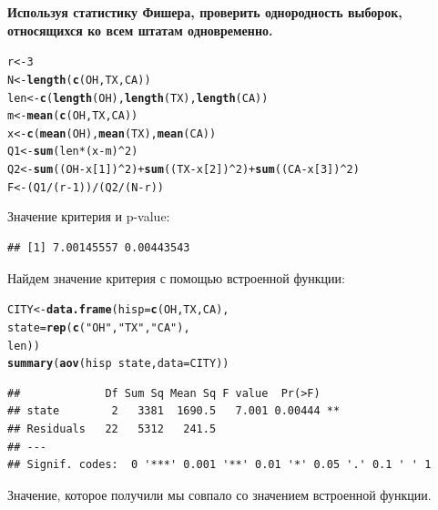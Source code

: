 \documentclass{article}\usepackage[]{graphicx}\usepackage[]{color}
\makeatletter
\newcommand{\hlnum}[1]{\textcolor[rgb]{0.686,0.059,0.569}{#1}}%
\newcommand{\hlstr}[1]{\textcolor[rgb]{0.192,0.494,0.8}{#1}}%
\newcommand{\hlopt}[1]{\textcolor[rgb]{0,0,0}{#1}}%
\newcommand{\hlstd}[1]{\textcolor[rgb]{0.345,0.345,0.345}{#1}}%
\newcommand{\hlkwb}[1]{\textcolor[rgb]{0.69,0.353,0.396}{#1}}%
\newcommand{\hlkwc}[1]{\textcolor[rgb]{0.333,0.667,0.333}{#1}}%
\newcommand{\hlkwd}[1]{\textcolor[rgb]{0.737,0.353,0.396}{\textbf{#1}}}%
\newenvironment{kframe}{%
 \def\at@end@of@kframe{}%
 \ifinner\ifhmode%
  \def\at@end@of@kframe{\end{minipage}}%
  \begin{minipage}{\columnwidth}%
 \fi\fi%
 \def\FrameCommand##1{\hskip\@totalleftmargin \hskip-\fboxsep
 \colorbox{shadecolor}{##1}\hskip-\fboxsep
     \hskip-\linewidth \hskip-\@totalleftmargin \hskip\columnwidth}%
 \MakeFramed {\advance\hsize-\width
   \@totalleftmargin\z@ \linewidth\hsize
   \@setminipage}}%
 {\par\unskip\endMakeFramed%
 \at@end@of@kframe}
\newenvironment{knitrout}{}{} %
\makeatother
\begin{document}
\textbf{Используя статистику Фишера, проверить однородность выборок, относящихся ко всем штатам одновременно.}

\begin{knitrout}
\color{fgcolor}\begin{kframe}
\begin{alltt}
\hlstd{r} \hlkwb{<-} \hlnum{3}
\hlstd{N} \hlkwb{<-} \hlkwd{length}\hlstd{(}\hlkwd{c}\hlstd{(OH, TX, CA))}
\hlstd{len} \hlkwb{<-} \hlkwd{c}\hlstd{(}\hlkwd{length}\hlstd{(OH),} \hlkwd{length}\hlstd{(TX),} \hlkwd{length}\hlstd{(CA))}
\hlstd{m} \hlkwb{<-} \hlkwd{mean}\hlstd{(}\hlkwd{c}\hlstd{(OH, TX, CA))}
\hlstd{x} \hlkwb{<-} \hlkwd{c}\hlstd{(}\hlkwd{mean}\hlstd{(OH),} \hlkwd{mean}\hlstd{(TX),} \hlkwd{mean}\hlstd{(CA))}
\hlstd{Q1} \hlkwb{<-} \hlkwd{sum}\hlstd{(len} \hlopt{*} \hlstd{(x} \hlopt{-} \hlstd{m)}\hlopt{^}\hlnum{2}\hlstd{)}
\hlstd{Q2} \hlkwb{<-} \hlkwd{sum}\hlstd{((OH} \hlopt{-} \hlstd{x[}\hlnum{1}\hlstd{])}\hlopt{^}\hlnum{2}\hlstd{)} \hlopt{+} \hlkwd{sum}\hlstd{((TX} \hlopt{-} \hlstd{x[}\hlnum{2}\hlstd{])}\hlopt{^}\hlnum{2}\hlstd{)} \hlopt{+} \hlkwd{sum}\hlstd{((CA} \hlopt{-} \hlstd{x[}\hlnum{3}\hlstd{])}\hlopt{^}\hlnum{2}\hlstd{)}
\hlstd{F} \hlkwb{<-} \hlstd{(Q1}\hlopt{/}\hlstd{(r} \hlopt{-} \hlnum{1}\hlstd{))} \hlopt{/} \hlstd{(Q2}\hlopt{/}\hlstd{(N} \hlopt{-} \hlstd{r))}
\end{alltt}
\end{kframe}
\end{knitrout}
Значение критерия и p-value:
\begin{knitrout}
\color{fgcolor}\begin{kframe}
\begin{verbatim}
## [1] 7.00145557 0.00443543
\end{verbatim}
\end{kframe}
\end{knitrout}
\newpage
Найдем значение критерия с помощью встроенной функции:
\begin{knitrout}
\color{fgcolor}\begin{kframe}
\begin{alltt}
\hlstd{CITY} \hlkwb{<-}\hlkwd{data.frame}\hlstd{(}\hlkwc{hisp} \hlstd{=} \hlkwd{c}\hlstd{(OH,TX,CA),}
                  \hlkwc{state} \hlstd{=} \hlkwd{rep}\hlstd{(}\hlkwd{c}\hlstd{(}\hlstr{"OH"}\hlstd{,}\hlstr{"TX"}\hlstd{,}\hlstr{"CA"}\hlstd{),}
                  \hlstd{len))}
\hlkwd{summary}\hlstd{(}\hlkwd{aov}\hlstd{(hisp}\hlopt{~}\hlstd{state,} \hlkwc{data} \hlstd{= CITY))}
\end{alltt}
\begin{verbatim}
##             Df Sum Sq Mean Sq F value  Pr(>F)   
## state        2   3381  1690.5   7.001 0.00444 **
## Residuals   22   5312   241.5                   
## ---
## Signif. codes:  0 '***' 0.001 '**' 0.01 '*' 0.05 '.' 0.1 ' ' 1
\end{verbatim}
\end{kframe}
\end{knitrout}
Значение, которое получили мы совпало со значением встроенной функции.
\end{document}
